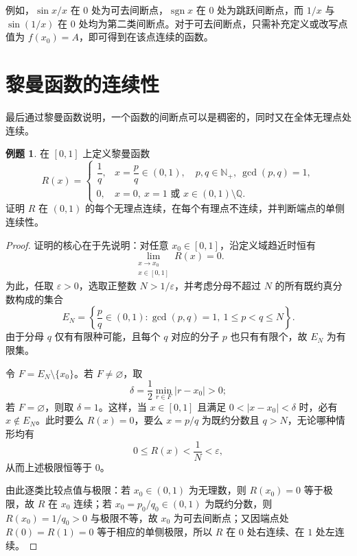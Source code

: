 \documentclass[UTF8,fontset=fandol,a4paper,12pt]{ctexart}
\theoremstyle{definition}
\newtheorem*{example}{例题}
\begin{document}
例如，$\sin x/x$ 在 $0$ 处为可去间断点，$\operatorname{sgn}x$ 在 $0$ 处为跳跃间断点，而 $1/x$ 与 $\sin(1/x)$ 在 $0$ 处均为第二类间断点。对于可去间断点，只需补充定义或改写点值为 $f(x_0)=A$，即可得到在该点连续的函数。

\newpage
\section{黎曼函数的连续性}
最后通过黎曼函数说明，一个函数的间断点可以是稠密的，同时又在全体无理点处连续。

\begin{example}
在 $[0,1]$ 上定义黎曼函数
\[
 R(x)=\begin{cases}
 \dfrac1q,&x=\dfrac pq\in(0,1),\quad p,q\in\mathbb N_+,\ \gcd(p,q)=1,\\[4pt]
 0,&x=0,\ x=1\text{ 或 }x\in(0,1)\setminus\mathbb Q.
 \end{cases}
\]
证明 $R$ 在 $(0,1)$ 的每个无理点连续，在每个有理点不连续，并判断端点的单侧连续性。
\end{example}
\begin{proof}
证明的核心在于先说明：对任意 $x_0\in[0,1]$，沿定义域趋近时恒有
\[
 \lim_{\substack{x\to x_0\\x\in[0,1]}}R(x)=0.
\]
为此，任取 $\varepsilon>0$，选取正整数 $N>1/\varepsilon$，并考虑分母不超过 $N$ 的所有既约真分数构成的集合
\[
 E_N=\left\{\frac pq\in(0,1):\gcd(p,q)=1,\ 1\le p<q\le N\right\}.
\]
由于分母 $q$ 仅有有限种可能，且每个 $q$ 对应的分子 $p$ 也只有有限个，故 $E_N$ 为有限集。

令 $F=E_N\setminus\{x_0\}$。若 $F\ne\varnothing$，取
\[
 \delta=\frac12\min_{r\in F}|r-x_0|>0;
\]
若 $F=\varnothing$，则取 $\delta=1$。这样，当 $x\in[0,1]$ 且满足 $0<|x-x_0|<\delta$ 时，必有 $x\notin E_N$。此时要么 $R(x)=0$，要么 $x=p/q$ 为既约分数且 $q>N$，无论哪种情形均有
\[
 0\le R(x)<\frac1N<\varepsilon,
\]
从而上述极限恒等于 $0$。

由此逐类比较点值与极限：若 $x_0\in(0,1)$ 为无理数，则 $R(x_0)=0$ 等于极限，故 $R$ 在 $x_0$ 连续；若 $x_0=p_0/q_0\in(0,1)$ 为既约分数，则 $R(x_0)=1/q_0>0$ 与极限不等，故 $x_0$ 为可去间断点；又因端点处 $R(0)=R(1)=0$ 等于相应的单侧极限，所以 $R$ 在 $0$ 处右连续、在 $1$ 处左连续。
\end{proof}
\end{document}
